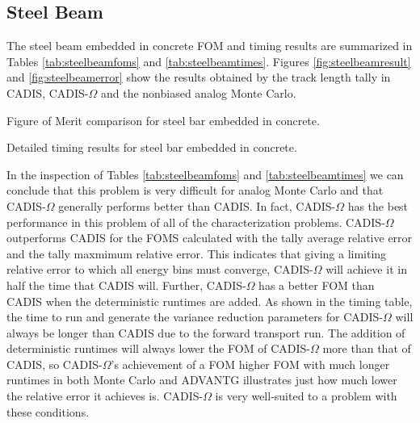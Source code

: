 \subsection{Steel Beam}
\label{subsec:resultbeam}

The steel beam embedded in concrete FOM and timing
results are summarized in Tables
\ref{tab:steelbeamfoms} and \ref{tab:steelbeamtimes}. Figures
\ref{fig:steelbeamresult} and \ref{fig:steelbeamerror} show the results obtained
by the track length tally in CADIS, CADIS-$\Omega$ and the nonbiased analog
Monte Carlo.

\begin{table}[h!]
  \centering
  
  \caption[Figure of Merit comparison for steel bar embedded in concrete.]
  {Figure of Merit comparison for steel bar embedded in concrete. }
  \label{tab:steelbeamfoms}
\end{table}

\begin{table}[h!]
  \centering
  
  \caption[Detailed timing results for steel bar embedded in concrete.]
  {Detailed timing results for steel bar embedded in concrete.}
  \label{tab:steelbeamtimes}
\end{table}

In the inspection of Tables \ref{tab:steelbeamfoms} and
\ref{tab:steelbeamtimes} we can conclude that this problem is very difficult for
analog Monte Carlo and that CADIS-$\Omega$ generally performs better than CADIS.
In fact, CADIS-$\Omega$ has the best performance
in this problem of all of the characterization problems.
CADIS-$\Omega$ outperforms CADIS for
the FOMS calculated with the tally average relative error and the tally maxmimum
relative error. This indicates that giving a limiting relative error to which
all energy bins must converge, CADIS-$\Omega$ will achieve it in half the time
that CADIS will. Further, CADIS-$\Omega$ has a better FOM than CADIS when the
deterministic runtimes are added. As shown in the timing table, the time to run
and generate the variance reduction parameters for CADIS-$\Omega$ will always be
longer than CADIS due to the forward transport run. The addition of
deterministic runtimes will always lower the FOM of CADIS-$\Omega$ more than
that of CADIS, so CADIS-$\Omega$'s achievement of a FOM higher FOM with much
longer runtimes in both Monte Carlo and ADVANTG illustrates just how much lower
the relative error it achieves is. CADIS-$\Omega$ is very well-suited to a
problem with these conditions.

